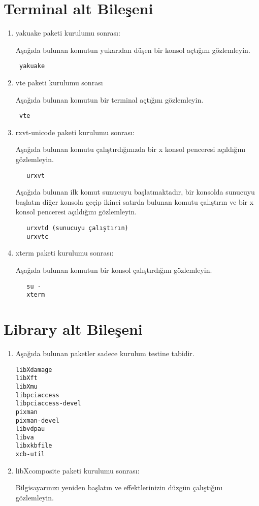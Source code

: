 \documentclass[a4paper,10pt]{article}
\begin{document}
\section{Terminal alt Bileşeni}
\begin{enumerate}
\item yakuake paketi kurulumu sonrası:

Aşağıda bulunan komutun yukarıdan düşen bir konsol açtığını gözlemleyin.

\begin{verbatim}
 yakuake
\end{verbatim}

\item vte paketi kurulumu sonrası

Aşağıda bulunan komutun bir terminal açtığını gözlemleyin.
\begin{verbatim}
 vte 
\end{verbatim}

  \item rxvt-unicode paketi kurulumu sonrası:

  Aşağıda bulunan komutu çalıştırdığınızda bir x konsol penceresi açıldığını gözlemleyin.
  \begin{verbatim}
   urxvt
  \end{verbatim}

  Aşağıda bulunan ilk komut sunucuyu başlatmaktadır, bir konsolda sunucuyu başlatın diğer konsola geçip ikinci satırda bulunan komutu çalıştırın ve bir x konsol penceresi açıldığını gözlemleyin.
  \begin{verbatim}
   urxvtd (sunucuyu çalıştırın)
   urxvtc
  \end{verbatim}

  \item xterm paketi kurulumu sonrası:

  Aşağıda bulunan komutun bir konsol çalıştırdığını gözlemleyin.
  \begin{verbatim}
   su -
   xterm
  \end{verbatim}
\end{enumerate}
\section{Library alt Bileşeni}
\begin{enumerate}
 \item Aşağıda bulunan paketler sadece kurulum testine tabidir.
  \begin{verbatim}
libXdamage
libXft
libXmu
libpciaccess
libpciaccess-devel
pixman
pixman-devel
libvdpau
libva
libxkbfile
xcb-util
  \end{verbatim}

\item libXcomposite paketi kurulumu sonrası:

Bilgisayarınızı yeniden başlatın ve effektlerinizin düzgün çalıştığını gözlemleyin.

\end{enumerate}
\end{document}

